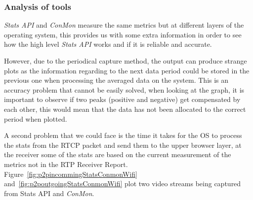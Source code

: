 \subsubsection{Analysis of tools}

{\it Stats API} and {\it ConMon} measure the same metrics but at different layers of the operating system, this provides us with some extra information in order to see how the high level {\it Stats API} works and if it is reliable and accurate.

However, due to the periodical capture method, the output can produce strange plots as the information regarding to the next data period could be stored in the previous one when processing the averaged data on the system. This is an accuracy problem that cannot be easily solved, when looking at the graph, it is important to observe if two peaks (positive and negative) get compensated by each other, this would mean that the data has not been allocated to the correct period when plotted. 


A second problem that we could face is the time it takes for the OS to process the stats from the RTCP packet and send them to the upper browser layer, at the receiver some of the stats are based on the current measurement of the metrics not in the RTP Receiver Report. Figure~\ref{fig:p2pincommingStatsConmonWifi} and~\ref{fig:p2poutgoingStatsConmonWifi} plot two video streams being captured from Stats API and {\it ConMon}.

